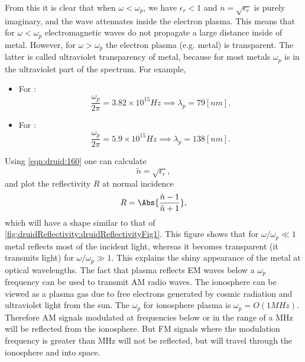 %
From this it is clear that when \( \omega < \omega_p \), we have \( \epsilon_r < 1 \) and \( n = \sqrt{\epsilon_r} \) is purely imaginary, and the wave attenuates inside the electron plasma.
%
This means that for \( \omega < \omega_p \) electromagnetic waves do not propagate a large distance inside of metal.  However, for \( \omega > \omega_p \) the electron plasma (e.g. metal) is transparent.  The latter is called ultraviolet transparency of metal, because for most metals \( \omega_p \) is in the ultraviolet part of the spectrum.  For example,
%
\begin{itemize}
\item For :
\begin{equation}\label{eqn:druid:180}
\frac{\omega_p}{2 \pi} = 3.82 \times 10^{15} \si{Hz} \implies \lambda_p = 79 [nm].
\end{equation}
\item For :
\begin{equation}\label{eqn:druid:200}
\frac{\omega_p}{2 \pi} = 5.9 \times 10^{15} \si{Hz} \implies \lambda_p = 138 [nm].
\end{equation}
\end{itemize}
%
Using \cref{eqn:druid:160} one can calculate
%
\begin{dmath}\label{eqn:druid:220}
\tilde{n} = \sqrt{\epsilon_r},
\end{dmath}
%
and plot the reflectivity \( R \) at normal incidence
%
\begin{dmath}\label{eqn:druid:240}
R = \Abs{ \frac{\tilde{n} - 1 }{\tilde{n} + 1} },
\end{dmath}
%
which will have a shape similar to that of \cref{fig:druidReflectivity:druidReflectivityFig1}.
%
%
This figure shows that for \( \omega/\omega_p \ll 1 \) metal reflects most of the incident light, whereas it becomes transparent (it transmits light) for \( \omega/\omega_p \gg 1 \).  This explains the shiny appearance of the metal at optical wavelengths.
%
The fact that plasma reflects EM waves below a \( \omega_p \) frequency can be used to transmit AM radio waves.  The ionosphere can be viewed as a plasma gas due to free electrons generated by cosmic radiation and ultraviolet light from the sun.  The \( \omega_p \) for ionosphere plasma is \( \omega_p = O(1 \si{MHz}) \).  Therefore AM signals modulated at frequencies below or in the range of a \si{MHz} will be reflected from the ionosphere.  But FM signals where the modulation frequency is greater than \si{MHz} will not be reflected, but will travel through the ionosphere and into space.
%
